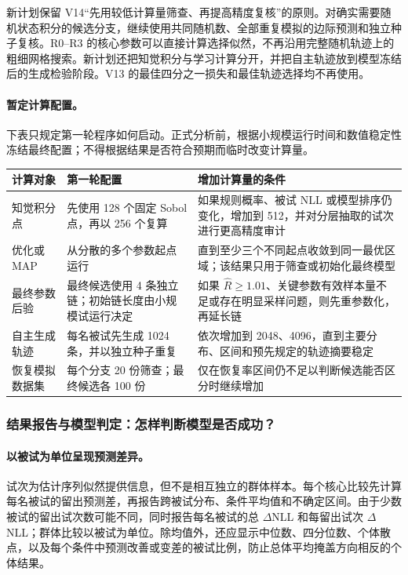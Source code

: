 新计划保留 V14“先用较低计算量筛查、再提高精度复核”的原则。对确实需要随机状态积分的候选分支，继续使用共同随机数、全部重复模拟的边际预测和独立种子复核。R0--R3 的核心参数可以直接计算选择似然，不再沿用完整随机轨迹上的粗细网格搜索。新计划还把知觉积分与学习计算分开，并把自主轨迹放到模型冻结后的生成检验阶段。V13 的最佳四分之一损失和最佳轨迹选择均不再使用。

\paragraph{暂定计算配置。}
下表只规定第一轮程序如何启动。正式分析前，根据小规模运行时间和数值稳定性冻结最终配置；不得根据结果是否符合预期而临时改变计算量。
\begin{center}
\small
\begin{tabular}{p{}|p{}|p{}}
\hline
计算对象 & 第一轮配置 & 增加计算量的条件\\
\hline
知觉积分点
& 先使用 128 个固定 Sobol 点，再以 256 个复算
& 如果规则概率、被试 NLL 或模型排序仍变化，增加到 512，并对分层抽取的试次进行更高精度审计\\
\hline
优化或 MAP
& 从分散的多个参数起点运行
& 直到至少三个不同起点收敛到同一最优区域；该结果只用于筛查或初始化最终模型\\
\hline
最终参数后验
& 最终候选使用 4 条独立链；初始链长度由小规模试运行决定
& 如果 $\widehat R\geq1.01$、关键参数有效样本量不足或存在明显采样问题，则先重参数化，再延长链\\
\hline
自主生成轨迹
& 每名被试先生成 1024 条，并以独立种子重复
& 依次增加到 2048、4096，直到主要分布、区间和预先规定的轨迹摘要稳定\\
\hline
恢复模拟数据集
& 每个分支 20 份筛查；最终候选各 100 份
& 仅在恢复率区间仍不足以判断候选能否区分时继续增加\\
\hline
\end{tabular}
\normalsize
\end{center}


\subsubsection{结果报告与模型判定：怎样判断模型是否成功？}

\paragraph{以被试为单位呈现预测差异。}
试次为估计序列似然提供信息，但不是相互独立的群体样本。每个核心比较先计算每名被试的留出预测差，再报告跨被试分布、条件平均值和不确定区间。由于少数被试的留出试次数可能不同，同时报告每名被试的总 $\Delta$NLL 和每留出试次 $\Delta$NLL；群体比较以被试为单位。除均值外，还应显示中位数、四分位数、个体散点，以及每个条件中预测改善或变差的被试比例，防止总体平均掩盖方向相反的个体结果。

